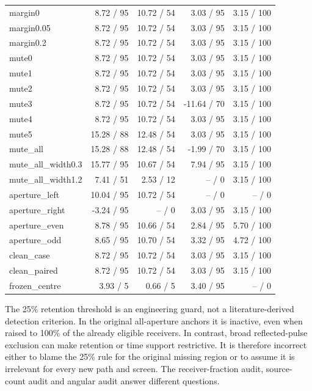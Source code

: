 \begin{longtable}{@{}lrrrr@{}}
margin0 & 8.72 / 95 & 10.72 / 54 & 3.03 / 95 & 3.15 / 100\\
margin0.05 & 8.72 / 95 & 10.72 / 54 & 3.03 / 95 & 3.15 / 100\\
margin0.2 & 8.72 / 95 & 10.72 / 54 & 3.03 / 95 & 3.15 / 100\\
mute0 & 8.72 / 95 & 10.72 / 54 & 3.03 / 95 & 3.15 / 100\\
mute1 & 8.72 / 95 & 10.72 / 54 & 3.03 / 95 & 3.15 / 100\\
mute2 & 8.72 / 95 & 10.72 / 54 & 3.03 / 95 & 3.15 / 100\\
mute3 & 8.72 / 95 & 10.72 / 54 & -11.64 / 70 & 3.15 / 100\\
mute4 & 8.72 / 95 & 10.72 / 54 & 3.03 / 95 & 3.15 / 100\\
mute5 & 15.28 / 88 & 12.48 / 54 & 3.03 / 95 & 3.15 / 100\\
mute\_\allowbreak all & 15.28 / 88 & 12.48 / 54 & -1.99 / 70 & 3.15 / 100\\
mute\_\allowbreak all\_\allowbreak width0.3 & 15.77 / 95 & 10.67 / 54 & 7.94 / 95 & 3.15 / 100\\
mute\_\allowbreak all\_\allowbreak width1.2 & 7.41 / 51 & 2.53 / 12 & -- / 0 & 3.15 / 100\\
aperture\_\allowbreak left & 10.04 / 95 & 10.72 / 54 & -- / 0 & -- / 0\\
aperture\_\allowbreak right & -3.24 / 95 & -- / 0 & 3.03 / 95 & 3.15 / 100\\
aperture\_\allowbreak even & 8.78 / 95 & 10.66 / 54 & 2.84 / 95 & 5.70 / 100\\
aperture\_\allowbreak odd & 8.65 / 95 & 10.70 / 54 & 3.32 / 95 & 4.72 / 100\\
clean\_\allowbreak case & 8.72 / 95 & 10.72 / 54 & 3.03 / 95 & 3.15 / 100\\
clean\_\allowbreak paired & 8.72 / 95 & 10.72 / 54 & 3.03 / 95 & 3.15 / 100\\
frozen\_\allowbreak centre & 3.93 / 5 & 0.66 / 5 & 3.40 / 95 & -- / 0\\
\bottomrule\end{longtable}\endgroup

The 25\% retention threshold is an engineering guard, not a literature-derived detection criterion. In the original all-aperture anchors it is inactive, even when raised to 100\% of the already eligible receivers. In contrast, broad reflected-pulse exclusion can make retention or time support restrictive. It is therefore incorrect either to blame the 25\% rule for the original missing region or to assume it is irrelevant for every new path and screen. The receiver-fraction audit, source-count audit and angular audit answer different questions.

